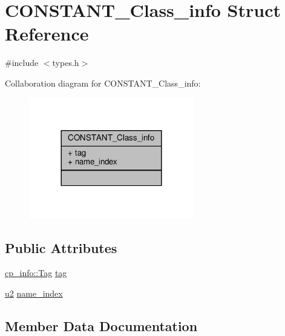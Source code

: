 \hypertarget{structCONSTANT__Class__info}{}\section{C\+O\+N\+S\+T\+A\+N\+T\+\_\+\+Class\+\_\+info Struct Reference}
\label{structCONSTANT__Class__info}


{\ttfamily \#include $<$types.\+h$>$}



Collaboration diagram for C\+O\+N\+S\+T\+A\+N\+T\+\_\+\+Class\+\_\+info\+:\nopagebreak
\begin{figure}[H]
\begin{center}
\leavevmode
\includegraphics[width=204pt]{structCONSTANT__Class__info__coll__graph}
\end{center}
\end{figure}
\subsection*{Public Attributes}
\begin{DoxyCompactItemize}
\item 
\hyperlink{structcp__info_acdef8472ed83e12e3a87bca8d6001f69}{cp\+\_\+info\+::\+Tag} \hyperlink{structCONSTANT__Class__info_aeb3e30f283579d0958ab77e115ce70af}{tag}
\item 
\hyperlink{types_8h_ae676e9207f57fb921dca7366b2f59c53}{u2} \hyperlink{structCONSTANT__Class__info_af37beebaf6ea2ba2d4b4d298d41d2904}{name\+\_\+index}
\end{DoxyCompactItemize}


\subsection{Member Data Documentation}
\mbox{\label{structCONSTANT__Class__info_af37beebaf6ea2ba2d4b4d298d41d2904}} 

